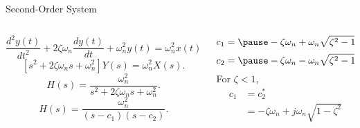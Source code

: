 \begin{frame}[t]{Second-Order System}
    \begin{columns}[t]
        \begin{column}{6cm}
            \begin{equation*}
                \dfrac{d^2y(t)}{dt^2} + 2\zeta\omega_n\dfrac{dy(t)}{dt} + \omega_n^2y(t) = \omega_n^2x(t).
            \end{equation*}
            \pause
            {
                \begin{equation*}
                    \left[s^2 + 2\zeta\omega_ns + \omega_n^2\right]Y(s) = \omega_n^2X(s).
                \end{equation*}
            }
            \pause
            {
                \begin{equation*}
                    H(s) = \dfrac{\omega_n^2}{s^2 + 2\zeta\omega_ns + \omega_n^2}.
                \end{equation*}
            }
            \pause
            {
                \begin{equation*}
                    H(s) = \dfrac{\omega_n^2}{(s - c_1)(s - c_2)}.
                \end{equation*}
            }

        \end{column}
        \begin{column}{4cm}
            {
                \begin{equation*}
                    c_1 =\pause -\zeta\omega_n + \omega_n\sqrt{\zeta^2 - 1}
                \end{equation*}
            }
            \vspace{-0.2in}
            {
                \begin{equation*}
                    c_2 =\pause -\zeta\omega_n - \omega_n\sqrt{\zeta^2 - 1}
                \end{equation*}
            }
            For $\zeta < 1$,
            \begin{equation*}
                \begin{split}
                    c_1&=c_2^\ast\\
                    &= -\zeta\omega_n + j\omega_n\sqrt{1-\zeta^2}\\
                \end{split}
            \end{equation*}

        \end{column}
    \end{columns}

\end{frame}

